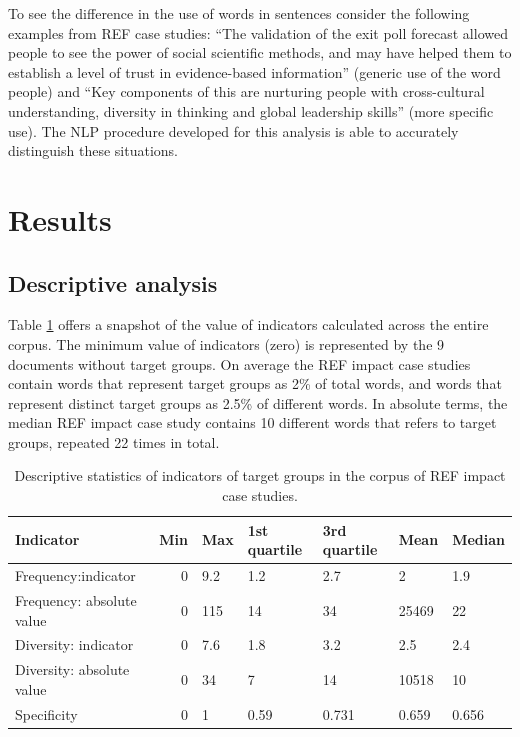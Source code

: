 \documentclass[b5paper,]{book}
\theoremstyle{definition}
\theoremstyle{definition}
\theoremstyle{definition}
\theoremstyle{remark}
\begin{document}
To see the difference in the use of words in sentences consider the
following examples from REF case studies: ``The validation of the exit
poll forecast allowed people to see the power of social scientific
methods, and may have helped them to establish a level of trust in
evidence-based information'' (generic use of the word people) and ``Key
components of this are nurturing people with cross-cultural
understanding, diversity in thinking and global leadership skills''
(more specific use). The NLP procedure developed for this analysis is
able to accurately distinguish these situations.

\section{Results}\label{results-12}

\subsection{Descriptive analysis}\label{descriptive-analysis}

Table \ref{tab:impact2} offers a snapshot of the value of indicators
calculated across the entire corpus. The minimum value of indicators
(zero) is represented by the 9 documents without target groups. On
average the REF impact case studies contain words that represent target
groups as 2\% of total words, and words that represent distinct target
groups as 2.5\% of different words. In absolute terms, the median REF
impact case study contains 10 different words that refers to target
groups, repeated 22 times in total.

\begin{table}

\caption{\label{tab:impact2}Descriptive statistics of indicators of target groups in the corpus of REF impact case studies.}
\centering
\begin{tabular}[t]{lrlllll}
\toprule
Indicator & Min & Max & 1st quartile & 3rd quartile & Mean & Median\\
\midrule
Frequency:indicator & 0 & 9.2 & 1.2 & 2.7 & 2 & 1.9\\
Frequency: absolute value & 0 & 115 & 14 & 34 & 25469 & 22\\
Diversity: indicator & 0 & 7.6 & 1.8 & 3.2 & 2.5 & 2.4\\
Diversity: absolute value & 0 & 34 & 7 & 14 & 10518 & 10\\
Specificity & 0 & 1 & 0.59 & 0.731 & 0.659 & 0.656\\
\bottomrule
\end{tabular}
\end{table}
\end{document}
